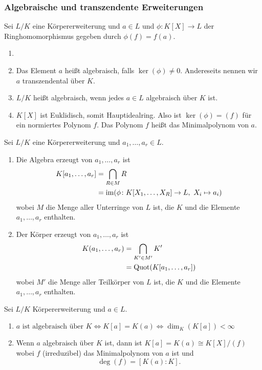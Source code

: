 \subsubsection{Algebraische und transzendente Erweiterungen}
\begin{Def}Sei \(L/K\) eine Körpererweiterung und \(a\in L\) und \(\phi\colon K[X]\to L\) der Ringhomomorphismus gegeben durch \(\phi(f)=f(a)\).
    \begin{enumerate}
        \item []
        \item  Das Element \(a\) heißt algebraisch, falls \(\ker(\phi)\neq 0\). Andereseits nennen wir \(a\) transzendental über \(K\).
        \item \(L/K\) heißt algebraisch, wenn jedes \(a\in L\) algebraisch über \(K\) ist.
        \item  \(K[X]\) ist Euklidisch, somit Hauptidealring. Also ist \(\ker(\phi)=(f)\) für ein normiertes Polynom \(f\). Das Polynom \(f\) heißt das Minimalpolynom von \(a\).
    \end{enumerate}
\end{Def}
\begin{Def}
    Sei \(L/K\) eine Körpererweiterung und \(a_1,\dots,a_r\in L\).
    \begin{enumerate}
        \item Die Algebra erzeugt von \(a_1,\dots,a_r\) ist \begin{align*} 
        K[a_1,\dots,a_r]&=\bigcap\limits_{R\in M}R\\
        &=\operatorname{im}(\phi\colon K[X_1,\dots,X_R]\to L,\ X_i\mapsto a_i)
        \end{align*} wobei \(M\) die Menge aller Unterringe von \(L\) ist, die \(K\) und die Elemente \(a_1,\dots,a_r\) enthalten.
        \item Der Körper erzeugt von \(a_1,\dots,a_r\) ist \begin{align*} 
        K(a_1,\dots,a_r)&=\bigcap\limits_{K'\in M'}K'\\
        &=\operatorname{Quot}(K[a_1,\dots,a_r])
        \end{align*} wobei \(M'\) die Menge aller Teilkörper von \(L\) ist, die \(K\) und die Elemente \(a_1,\dots,a_r\) enthalten.
    \end{enumerate}
\end{Def}
\begin{Satz}
    Sei \(L/K\) Körpererweiterung und \(a\in L\).
    \begin{enumerate}
        \item \(a \text{ ist algebraisch über }K \iff K[a]=K(a)\iff \dim_K(K[a])<\infty\)
        \item Wenn \(a\) algebraisch über \(K\) ist, dann ist \(K[a]=K(a)\cong K[X]/(f)\) wobei \(f\) (irreduzibel) das Minimalpolynom von \(a\) ist und \[\deg(f)=[K(a):K].\]
    \end{enumerate}
\end{Satz}
